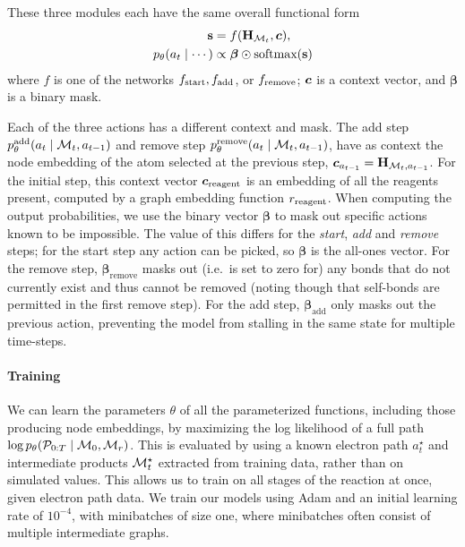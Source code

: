 These three modules each have the same overall functional form
\begin{align}
\textbf{s} &= f({\mathbf{H}}_{{\mathcal{M}}_t}, \bm{c}), \\
p_\theta(a_t \mid \cdots) &\propto \bm{\beta} \odot \mbox{softmax}(\bm{\textbf{s}})
\end{align}
where $f$ is one of the networks $f_{\textrm{start}}, f_{\textrm{add}}$, or $f_{\textrm{remove}}$; 
$\bm{c}$ is a context vector, and $\bm{\beta}$ is a binary mask.

Each of the three actions has a different context and mask.
The add step $p_\theta^\textrm{add}(a_t \mid {\mathcal{M}}_t, a_{t-1})$ and remove step $p_\theta^\textrm{remove}(a_t \mid {\mathcal{M}}_t, a_{t-1})$,
 have as context the node embedding of the atom selected at the previous step, $\bm{c}_{a_{t-1}} = {\mathbf{H}}_{{\mathcal{M}}_t, a_{t-1}}$. 
For the initial step, this context vector $\bm{c}_\mathrm{reagent}$ is an embedding of all the reagents present, computed 
by a graph embedding function $r_\mathrm{reagent}$.
When computing the output probabilities,
we use the binary vector $\bm{\beta}$ to mask out specific actions known to be impossible.
The value of this differs for the {\em start}, {\em add} and {\em remove} steps;
for the start step any action can be picked, so $\bm{\beta}$ is the all-ones vector.
For the remove step, $\bm{\beta}_\mathrm{remove}$ masks out (i.e.\ is set to zero for) any bonds that do not currently exist and thus cannot be removed (noting though that self-bonds are permitted in the first remove step).
For the add step, $\bm{\beta}_\textrm{add}$ only masks out the previous action, preventing the model from stalling in the same state for multiple time-steps. 
\paragraph{Training}
We can learn the parameters $\theta$ of all the parameterized functions, including those producing node embeddings, by maximizing the log likelihood of a full path $\log p_\theta({\mathcal{P}}_{0:T} \mid {\mathcal{M}}_0, {\mathcal{M}}_r)$.
This is evaluated by using a known electron path $a_t^\star$ and intermediate products ${\mathcal{M}}_t^\star$ extracted from training data,
rather than on simulated values. 
This allows us to train on all stages of the reaction at once, given electron path data.
We train our models using Adam \citep{kingma2014adam} and an initial learning rate of $10^{-4}$,
with minibatches of size one, where minibatches often consist of multiple intermediate graphs.


